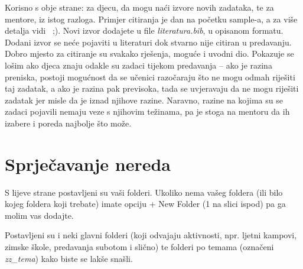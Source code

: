     Korisno s obje strane: za djecu, da mogu naći izvore novih zadataka, te za mentore, iz istog razloga.
    Primjer citiranja je dan na početku sample-a, a za više detalja vidi~\cite{overleaf_biblatex} ;).
    Novi izvor dodajete u file \emph{literatura.bib}, u opisanom formatu.
    Dodani izvor se neće pojaviti u literaturi dok stvarno nije citiran u predavanju.
    Dobro mjesto za citiranje su svakako rješenja, moguće i uvodni dio.
    Pokazuje se lošim ako djeca znaju odakle su zadaci tijekom predavanja -- ako je razina preniska, postoji mogućnost da se učenici razočaraju što ne mogu odmah riješiti taj zadatak, a ako je razina pak previsoka, tada se uvjeravaju da ne mogu riješiti zadatak jer misle da je iznad njihove razine. Naravno, razine na kojima su se zadaci pojavili nemaju veze s njihovim težinama, pa je stoga na mentoru da ih izabere i poreda najbolje što može.
    
    \section{Sprječavanje nereda}\label{sec:nered}
    
    S lijeve strane postavljeni su vaši folderi. Ukoliko nema vašeg foldera (ili bilo kojeg foldera koji trebate) imate opciju \textsf{+ New Folder} (1 na slici ispod) pa ga molim vas dodajte. \medskip
    
    Postavljeni su i neki glavni folderi (koji odvajaju aktivnosti, npr. ljetni kampovi, zimske škole, predavanja subotom i slično) te folderi po temama (označeni \emph{zz\_tema}) kako biste se lakše snašli. \medskip
    
